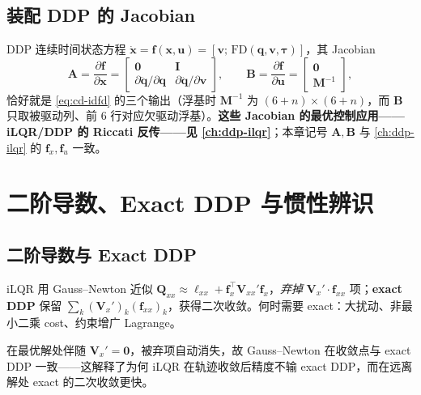 \subsection{装配 DDP 的 Jacobian}
DDP 连续时间状态方程 $\dot{\mathbf x}=\mathbf f(\mathbf x,\mathbf u)=[\mathbf v;\,\mathrm{FD}(\mathbf q,\mathbf v,\boldsymbol\tau)]$，其 Jacobian
\begin{equation}
  \mathbf A=\frac{\partial\mathbf f}{\partial\mathbf x}=\begin{bmatrix}\mathbf 0 & \mathbf I\\ \partial\ddot{\mathbf q}/\partial\mathbf q & \partial\ddot{\mathbf q}/\partial\mathbf v\end{bmatrix},\qquad \mathbf B=\frac{\partial\mathbf f}{\partial\mathbf u}=\begin{bmatrix}\mathbf 0\\ \mathbf M^{-1}\end{bmatrix},
  \label{eq:cd-ddp-jac}
\end{equation}
恰好就是 \cref{eq:cd-idfd} 的三个输出（浮基时 $\mathbf M^{-1}$ 为 $(6{+}n)\times(6{+}n)$，而 $\mathbf B$ 只取被驱动列、前 $6$ 行对应欠驱动浮基）。\textbf{这些 Jacobian 的最优控制应用——iLQR/DDP 的 Riccati 反传——见 \cref{ch:ddp-ilqr}}；本章记号 $\mathbf A,\mathbf B$ 与 \cref{ch:ddp-ilqr} 的 $\mathbf f_x,\mathbf f_u$ 一致。

\section{二阶导数、Exact DDP 与惯性辨识}
\label{sec:cd-second}

\subsection{二阶导数与 Exact DDP}
iLQR 用 Gauss--Newton 近似 $\mathbf Q_{xx}\approx\boldsymbol\ell_{xx}+\mathbf f_x^\top\mathbf V_{xx}'\mathbf f_x$，\emph{弃掉} $\mathbf V_x'\cdot\mathbf f_{xx}$ 项；\textbf{exact DDP} 保留 $\sum_k(\mathbf V_x')_k(\mathbf f_{xx})_k$，获得二次收敛。何时需要 exact：大扰动、非最小二乘 cost、约束增广 Lagrange。

\begin{insight}
在最优解处伴随 $\mathbf V_x'=\mathbf 0$，被弃项自动消失，故 Gauss--Newton 在收敛点与 exact DDP 一致——这解释了为何 iLQR 在轨迹收敛后精度不输 exact DDP，而在远离解处 exact 的二次收敛更快。
\end{insight}

